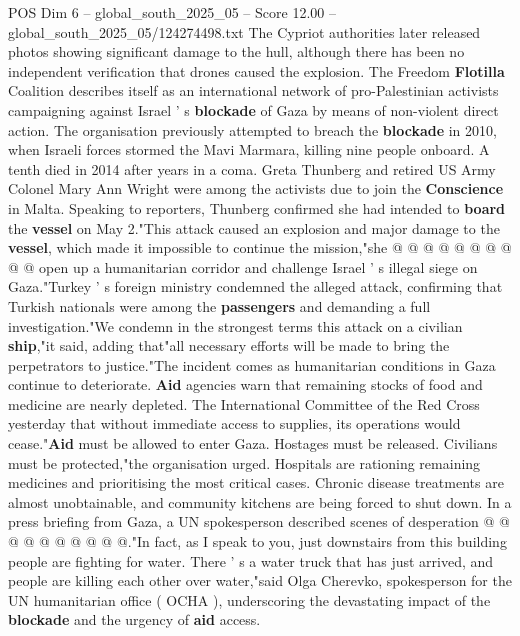 \begin{textsample}{POS Dim 6 – global\_south\_2025\_05 – Score 12.00 – global\_south\_2025\_05/124274498.txt}
The Cypriot authorities later released photos showing significant damage to the hull, although there has been no independent verification that drones caused the explosion.
The Freedom \textbf{Flotilla} Coalition describes itself as an international network of pro-Palestinian activists campaigning against Israel ' s \textbf{blockade} of Gaza by means of non-violent direct action.
The organisation previously attempted to breach the \textbf{blockade} in 2010, when Israeli forces stormed the Mavi Marmara, killing nine people onboard.
A tenth died in 2014 after years in a coma.
Greta Thunberg and retired US Army Colonel Mary Ann Wright were among the activists due to join the \textbf{Conscience} in Malta.
Speaking to reporters, Thunberg confirmed she had intended to \textbf{board} the \textbf{vessel} on May 2."This attack caused an explosion and major damage to the \textbf{vessel}, which made it impossible to continue the mission,"she @ @ @ @ @ @ @ @ @ @ open up a humanitarian corridor and challenge Israel ' s illegal siege on Gaza."Turkey ' s foreign ministry condemned the alleged attack, confirming that Turkish nationals were among the \textbf{passengers} and demanding a full investigation."We condemn in the strongest terms this attack on a civilian \textbf{ship},"it said, adding that"all necessary efforts will be made to bring the perpetrators to justice."The incident comes as humanitarian conditions in Gaza continue to deteriorate. \textbf{Aid} agencies warn that remaining stocks of food and medicine are nearly depleted.
The International Committee of the Red Cross yesterday that without immediate access to supplies, its operations would cease."\textbf{Aid} must be allowed to enter Gaza.
Hostages must be released.
Civilians must be protected,"the organisation urged.
Hospitals are rationing remaining medicines and prioritising the most critical cases.
Chronic disease treatments are almost unobtainable, and community kitchens are being forced to shut down.
In a press briefing from Gaza, a UN spokesperson described scenes of desperation @ @ @ @ @ @ @ @ @ @."In fact, as I speak to you, just downstairs from this building people are fighting for water.
There ' s a water truck that has just arrived, and people are killing each other over water,"said Olga Cherevko, spokesperson for the UN humanitarian office ( OCHA ), underscoring the devastating impact of the \textbf{blockade} and the urgency of \textbf{aid} access.

\end{textsample}
